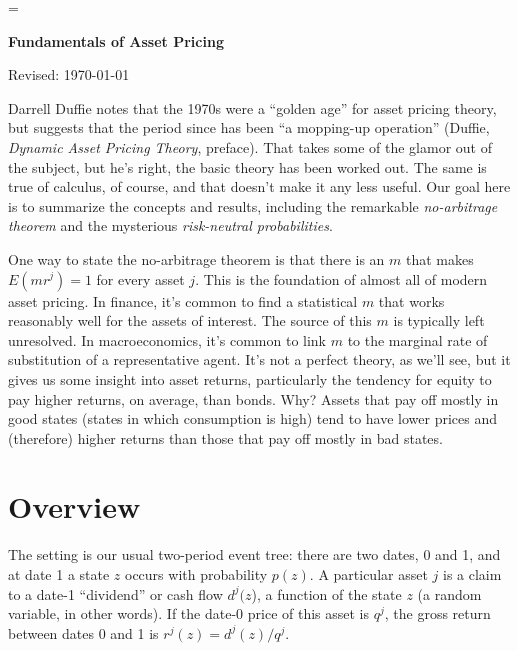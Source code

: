 \documentclass[11pt]{article}
\begin{document}
\parskip=\bigskipamount
\parindent=0.0in
\thispagestyle{empty}


\bigskip\bigskip
\centerline{\Large \bf Fundamentals of Asset Pricing}
\centerline{Revised: \today}

\begin{comment}
*** work in digression:  change of measure and Girsanov formula ***
\url{http://www.math.nyu.edu/faculty/goodman/teaching/StochCalc2012/notes/Week10.pdf}
\end{comment}

\bigskip
Darrell Duffie notes that the 1970s were a ``golden age''
for asset pricing theory,
but suggests that the period since has been ``a mopping-up operation''
(Duffie, {\it Dynamic Asset Pricing Theory\/}, preface).
That takes some of the glamor out of the subject,
but he's right, the basic theory has been worked out.
The same is true of calculus, of course,
and that doesn't make it any less useful.
Our goal here is to summarize the concepts and results,
including the remarkable {\it no-arbitrage theorem\/} and
the mysterious {\it risk-neutral probabilities\/}.

One way to state the no-arbitrage theorem is that there is an $m$ that makes
$E(mr^j) = 1$ for every asset $j$.
This is the foundation of almost all of modern asset pricing.
In finance, it's common to find a statistical $m$ that works reasonably well
for the assets of interest.
The source of this $m$ is typically left unresolved.
In macroeconomics, it's common to link $m$ to the marginal rate of substitution
of a representative agent.
It's not a perfect theory, as we'll see, but it gives us some insight into asset returns,
particularly the tendency for equity to pay higher returns, on average,
than bonds.
Why?
Assets that pay off mostly in good states (states in which consumption is high)
tend to have lower prices and (therefore) higher returns than those that pay off mostly in bad states.



\section{Overview}

The setting is our usual two-period event tree:
there are two dates, 0 and 1,
and at date 1 a state $z$ occurs with probability $p(z)$.
A particular asset $j$ is a claim to a date-1 ``dividend'' or cash flow $d^j(z$),
a function of the state $z$ (a random variable, in other words).
If the date-0 price of this asset is $q^j$,
the gross return between dates 0 and 1 is $r^j(z) = d^j(z) / q^j$.
\end{document}
